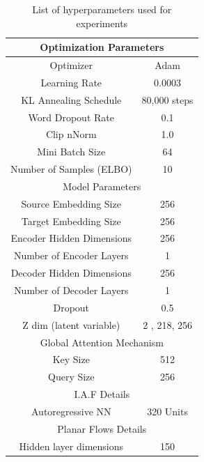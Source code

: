 \begin{table}[]
	\caption{List of hyperparameters used for experiments }
	\label{tab:hyperparams}
	\center
	\begin{tabular}{|c|c|}
		\hline
		\multicolumn{2}{|c|}{\textbf{Optimization Parameters}} \\ \hline
		Optimizer                        & Adam                \\ \hline
		Learning Rate                    & 0.0003              \\ \hline
		KL Annealing Schedule            & 80,000 steps        \\ \hline
		Word Dropout Rate                & 0.1                 \\ \hline
		Clip nNorm                        & 1.0                 \\ \hline
		Mini Batch Size                  & 64                  \\ \hline
		Number of Samples (ELBO)         & 10                  \\ \hline
		\multicolumn{2}{|c|}{Model Parameters}                 \\ \hline
		Source Embedding Size            & 256                 \\ \hline
		Target Embedding Size            & 256                 \\ \hline
		Encoder Hidden Dimensions        & 256                 \\ \hline
		Number of Encoder Layers         & 1                   \\ \hline
		Decoder Hidden Dimensions        & 256                 \\ \hline
		Number of Decoder Layers         & 1                   \\ \hline
		Dropout                          & 0.5                 \\ \hline
		Z dim (latent variable)          & 2 , 218, 256        \\ \hline
		\multicolumn{2}{|c|}{Global Attention Mechanism}       \\ \hline
		Key Size                         & 512                 \\ \hline
		Query Size                       & 256                 \\ \hline
		\multicolumn{2}{|c|}{I.A.F Details}                    \\ \hline
		Autoregressive NN                & 320 Units           \\ \hline
		\multicolumn{2}{|c|}{Planar Flows Details}             \\ \hline
		Hidden layer dimensions          & 150                 \\ \hline
	\end{tabular}
\end{table}



